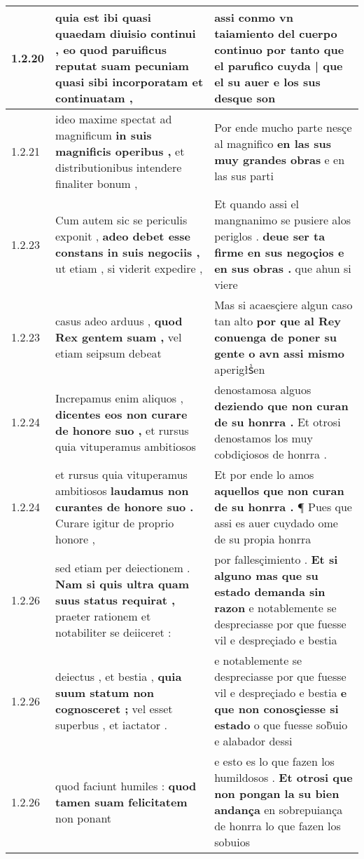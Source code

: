 \begin{tabular}{|p{1cm}|p{6.5cm}|p{6.5cm}|}
1.2.20 & quia est ibi quasi quaedam diuisio continui , \textbf{ eo quod paruificus reputat suam pecuniam } quasi sibi incorporatam et continuatam , & assi conmo vn taiamiento del cuerpo continuo \textbf{ por tanto que el parufico cuyda | que el su auer } e los sus desque son \\\hline
1.2.21 & ideo maxime spectat ad magnificum \textbf{ in suis magnificis operibus , } et distributionibus intendere finaliter bonum , & Por ende mucho parte nesçe al magnifico \textbf{ en las sus muy grandes obras } e en las sus parti \\\hline
1.2.23 & Cum autem sic se periculis exponit , \textbf{ adeo debet esse constans in suis negociis , } ut etiam , si viderit expedire , & Et quando assi el mangnanimo se pusiere alos periglos . \textbf{ deue ser ta firme en sus negoçios e en sus obras . } que ahun si viere \\\hline
1.2.23 & casus adeo arduus , \textbf{ quod Rex gentem suam , } vel etiam seipsum debeat & Mas si acaesçiere algun caso tan alto \textbf{ por que al Rey conuenga de poner su gente o avn assi mismo } aperigłsᷤen \\\hline
1.2.24 & Increpamus enim aliquos , \textbf{ dicentes eos non curare de honore suo , } et rursus quia vituperamus ambitiosos & denostamosa alguos \textbf{ deziendo que non curan de su honrra . } Et otrosi denostamos los muy cobdiçiosos de honrra . \\\hline
1.2.24 & et rursus quia vituperamus ambitiosos \textbf{ laudamus non curantes de honore suo . } Curare igitur de proprio honore , & Et por ende lo amos \textbf{ aquellos que non curan de su honrra . } ¶ Pues que assi es auer cuydado ome de su propia honrra \\\hline
1.2.26 & sed etiam per deiectionem . \textbf{ Nam si quis ultra quam suus status requirat , } praeter rationem et notabiliter se deiiceret : & por fallesçimiento . \textbf{ Et si alguno mas que su estado demanda sin razon } e notablemente se despreciasse por que fuesse vil e despreçiado e bestia \\\hline
1.2.26 & deiectus , et bestia , \textbf{ quia suum statum non cognosceret ; } vel esset superbus , et iactator . & e notablemente se despreciasse por que fuesse vil e despreçiado e bestia \textbf{ e que non conosçiesse si estado } o que fuesse sob̃uio e alabador dessi \\\hline
1.2.26 & quod faciunt humiles : \textbf{ quod tamen suam felicitatem } non ponant & e esto es lo que fazen los humildosos . \textbf{ Et otrosi que non pongan la su bien andança } en sobrepuiança de honrra lo que fazen los sobuios \\\hline

\end{tabular}
